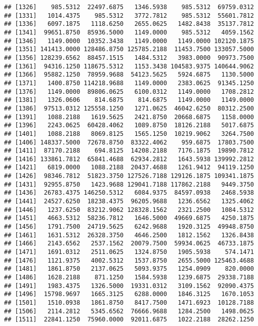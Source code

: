 \documentclass[]{article}
\begin{document}
\begin{verbatim}
## [1326]    985.5312  22497.6875   1346.5938    985.5312  69759.0312
## [1331]   1014.4375    985.5312   3772.7812    985.5312  55601.7812
## [1336]   6097.1875   1118.6250   2655.0625   1482.8438  35137.7812
## [1341]  99651.8750  85936.5000   1149.0000    985.5312   4059.1562
## [1346]   1149.0000  10352.3438   1149.0000   1149.0000 102120.1875
## [1351] 141413.0000 128486.8750 125785.2188  11453.7500 133057.5000
## [1356] 128239.6562  88457.1515   1484.5312   3983.0000  90973.7500
## [1361]  94316.1250 118675.5312   1153.3438 104583.9375 140644.9062
## [1366]  95882.1250  78959.9688  54123.5625   5924.6875   1130.5000
## [1371]   1400.8750 114218.9688   1149.0000   2383.0625  91345.1250
## [1376]   1149.0000  89806.0625   6100.0312   1149.0000   1708.2812
## [1381]   1326.0606    814.6875    814.6875   1149.0000   1149.0000
## [1386]  97513.0312 125558.1250   1271.0625  46042.6250  80312.2500
## [1391]   1088.2188   1619.5625   2421.8750  20668.6875   1158.0000
## [1396]   2243.0625  60428.4062   1089.8750  18126.2188   5017.6875
## [1401]   1088.2188   8069.8125   1565.1250  10219.9062   3264.7500
## [1406] 148337.5000  72678.8750  83322.4062    959.6875  17803.7500
## [1411]  87170.2188    694.8125  14208.2188   7176.1875  19890.7812
## [1416] 133861.7812  65841.4688  62934.2812   1643.5938 139992.2812
## [1421]   6819.0000   1088.2188  20437.4688   1261.9412  94119.1250
## [1426]  98346.7812  51823.3750 127526.7188 129126.1875 109341.1875
## [1431]  92955.8750   1423.9688 129041.7188 117862.2188   9449.3750
## [1436]  26783.4375 146250.5312   6084.9375  84597.0938   2468.5938
## [1441]  24527.6250  18238.4375  96205.9688   1236.6562   1325.4062
## [1446]   1237.6250  83212.9062 128328.1562   2321.2500   1084.5312
## [1451]   4663.5312  58236.7812   1646.5000  49669.6875   4250.1875
## [1456]   1791.7500  24719.5625   6242.9688   1920.3125  49948.8750
## [1461]   1631.5312  26328.3750   4646.2500   1812.1562   1326.8438
## [1466]   2143.6562   2537.1562  20079.7500  59934.0625  46733.1875
## [1471]   1691.0312   2511.0625   1324.8750   1905.5938    574.1471
## [1476]   1121.9375   4002.5312   1537.8750   2655.5000 125463.4688
## [1481]   1861.8750   2137.0625   5093.9375   1254.0909    820.0000
## [1486]   1628.2188    871.1250   1584.5938   1239.6875  29338.7188
## [1491]   1983.4375   1326.5000  19331.0312   3109.1562  92090.4375
## [1496]  15798.9697   1665.3125   6288.0000   1846.3125   1670.1053
## [1501]   1510.0938   1861.8750   8417.7500   1471.6923  10128.7188
## [1506]   2114.2812   5345.6562  76666.9688   1284.2500   1498.0625
## [1511]  22841.1250  75960.0000  92011.6875   1022.2188  28262.1250

\end{verbatim}
\end{document}
